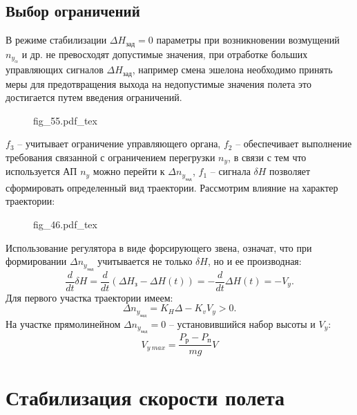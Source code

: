 \documentclass{article}
\newcommand{\incfig}[1]{
    {#1.pdf_tex}
}
\begin{document}
\subsection{Выбор ограничений}
В режиме стабилизации $\Delta H_\text{зад} = 0$ параметры при возникновении
возмущений $n_{y_\alpha}$ и др. не превосходят допустимые значения, при
отработке больших управляющих сигналов $\Delta H_\text{зад}$, например смена
эшелона необходимо принять меры для предотвращения выхода на недопустимые
значения полета это достигается путем введения ограничений.

\begin{figure}[ht]
    \centering
    \incfig{fig_55}
    \label{fig:fig_55}
\end{figure}

$f_3$ -- учитывает ограничение управляющего органа, $f_2$ -- обеспечивает
выполнение требования связанной с ограничением перегрузки $n_y$, в связи с тем
что используется АП $n_y$ можно перейти к $ \Delta n_{y_\text{зад}}$, $f_1$ --
сигнала $\delta H$ позволяет сформировать определенный вид траектории.
Рассмотрим влияние на характер траектории:

\begin{figure}[ht]
    \centering
    \incfig{fig_46}
    \label{fig:fig_46}
\end{figure}

Использование регулятора в виде форсирующего звена, означат, что при
формировании $ \Delta n_{y_\text{зад}}$ учитывается не только $\delta H$, но и
ее производная:
\[
    \frac{d}{dt} \delta H = \frac{d}{dt} (\Delta H_\text{з} - \Delta H (t)) = -
    \frac{d}{dt} \Delta H(t) = -V_y
    .\]
Для первого участка траектории имеем:
\[
    \Delta n_{y_\text{зад}} = K_H \Delta - K_v V_y > 0
    .\]
На участке прямолинейном $ \Delta n_{y_\text{зад}} = 0$ -- установившийся набор
высоты и $V_y$:
\[
    V_{y \ max} = \frac{P_\text{р} - P_\text{п}}{mg}V
\]

\section{Стабилизация скорости полета}
\end{document}
